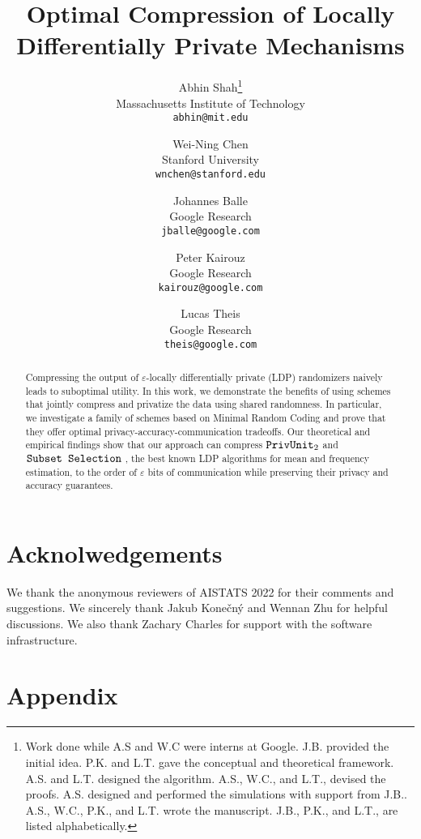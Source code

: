 \documentclass[11pt]{article}
\title{Optimal Compression of Locally Differentially Private Mechanisms}
\author{%
	Abhin Shah\footnote{Work done while A.S and W.C were interns at Google. J.B. provided the initial idea. P.K. and L.T. gave the conceptual and theoretical framework. A.S. and L.T. designed the algorithm. A.S., W.C., and L.T., devised the proofs. A.S. designed and performed the simulations with support from J.B.. A.S., W.C., P.K., and L.T. wrote the manuscript. J.B., P.K., and L.T., are listed alphabetically.}
	\\
	Massachusetts Institute of Technology\\
	\texttt{abhin@mit.edu} \\
	\and
	Wei-Ning Chen\footnotemark[1]
	\\
	Stanford University \\
	\texttt{wnchen@stanford.edu} \\
	\and
	Johannes Balle\footnotemark[1]
	\\
	Google Research \\
	\texttt{jballe@google.com}
	\and
	Peter Kairouz\footnotemark[1]
	\\
	Google Research \\
	\texttt{kairouz@google.com}
	\and
	Lucas Theis\footnotemark[1]
	\\
	Google Research \\
	\texttt{theis@google.com} 
}
\date{}
\begin{document}
\sloppy
\maketitle
\begin{abstract}
Compressing the output of $\varepsilon$-locally differentially private (LDP) randomizers naively leads to suboptimal utility. In this work, we demonstrate the benefits of using schemes that jointly compress and privatize the data using shared randomness. In particular, we investigate a family of schemes based on Minimal Random Coding \citep{HPHJ19} and prove that they offer optimal privacy-accuracy-communication tradeoffs. Our theoretical and empirical findings show that our approach can compress $\texttt{PrivUnit}_2$ \citep{BDFKR2018} and $\texttt{Subset Selection}$ \citep{YB18}, the best known LDP algorithms for mean and frequency estimation, to the order of $\varepsilon$ bits of communication while preserving their privacy and accuracy guarantees.
\end{abstract}







\section*{Acknolwedgements}

We thank the anonymous reviewers of AISTATS 2022 for their comments and suggestions.
We sincerely thank Jakub Kone\v{c}n\'{y} and Wennan Zhu for helpful discussions. We also thank Zachary Charles for support with the software infrastructure.



\clearpage
\appendix
\section*{Appendix}

\end{document}
